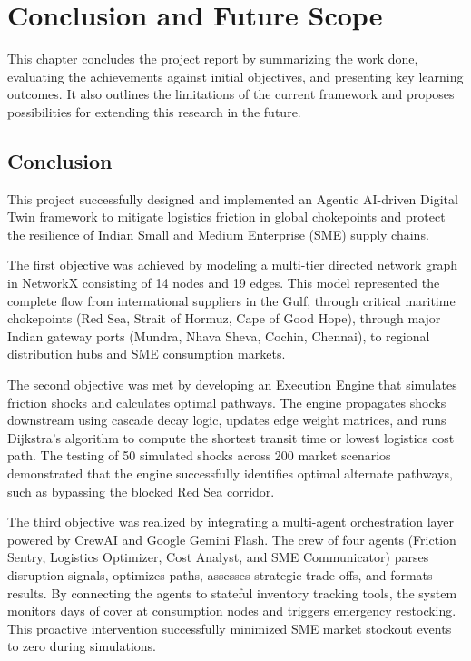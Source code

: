 \chapter{Conclusion and Future Scope}

This chapter concludes the project report by summarizing the work done, evaluating the achievements against initial objectives, and presenting key learning outcomes. It also outlines the limitations of the current framework and proposes possibilities for extending this research in the future.

\section{Conclusion}
This project successfully designed and implemented an Agentic AI-driven Digital Twin framework to mitigate logistics friction in global chokepoints and protect the resilience of Indian Small and Medium Enterprise (SME) supply chains. 

The first objective was achieved by modeling a multi-tier directed network graph in NetworkX consisting of 14 nodes and 19 edges. This model represented the complete flow from international suppliers in the Gulf, through critical maritime chokepoints (Red Sea, Strait of Hormuz, Cape of Good Hope), through major Indian gateway ports (Mundra, Nhava Sheva, Cochin, Chennai), to regional distribution hubs and SME consumption markets.

The second objective was met by developing an Execution Engine that simulates friction shocks and calculates optimal pathways. The engine propagates shocks downstream using cascade decay logic, updates edge weight matrices, and runs Dijkstra's algorithm to compute the shortest transit time or lowest logistics cost path. The testing of 50 simulated shocks across 200 market scenarios demonstrated that the engine successfully identifies optimal alternate pathways, such as bypassing the blocked Red Sea corridor.

The third objective was realized by integrating a multi-agent orchestration layer powered by CrewAI and Google Gemini Flash. The crew of four agents (Friction Sentry, Logistics Optimizer, Cost Analyst, and SME Communicator) parses disruption signals, optimizes paths, assesses strategic trade-offs, and formats results. By connecting the agents to stateful inventory tracking tools, the system monitors days of cover at consumption nodes and triggers emergency restocking. This proactive intervention successfully minimized SME market stockout events to zero during simulations.

